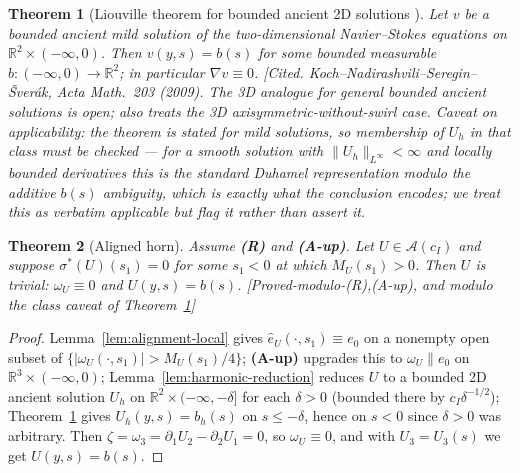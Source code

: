 \documentclass[11pt]{article}
\newtheorem{theorem}{Theorem}[section]
\theoremstyle{definition}
\theoremstyle{remark}
\newcommand{\R}{\mathbb{R}}
\begin{document}
\begin{theorem}[Liouville theorem for bounded ancient 2D solutions
  \cite{KNSS2009}]\label{thm:knss}
  Let $v$ be a bounded ancient mild solution of the two-dimensional
  Navier--Stokes equations on $\R^2\times(-\infty,0)$. Then $v(y,s)=b(s)$ for
  some bounded measurable $b:(-\infty,0)\to\R^2$; in particular
  $\nabla v\equiv0$.
  \emph{[Cited. Koch--Nadirashvili--Seregin--\v{S}ver\'ak, Acta Math.\ 203
  (2009). The 3D analogue for general bounded ancient solutions is open;
  \cite{KNSS2009} also treats the 3D axisymmetric-without-swirl case. Caveat
  on applicability: the theorem is stated for \emph{mild} solutions, so
  membership of $U_h$ in that class must be checked --- for a smooth solution
  with $\|U_h\|_{L^\infty}<\infty$ and locally bounded derivatives this is
  the standard Duhamel representation modulo the additive $b(s)$ ambiguity,
  which is exactly what the conclusion encodes; we treat this as verbatim
  applicable but flag it rather than assert it.}
\end{theorem}

\begin{theorem}[Aligned horn]\label{thm:aligned-horn}
  Assume \textbf{(R)} and \textbf{(A-up)}. Let $U\in\mathcal{A}(c_I)$ and
  suppose $\sigma^*(U)(s_1)=0$ for some $s_1<0$ at which $M_U(s_1)>0$. Then
  $U$ is trivial: $\omega_U\equiv0$ and $U(y,s)=b(s)$.
  \emph{[Proved-modulo-(R),(A-up), and modulo the class caveat of
  Theorem~\ref{thm:knss}]}
\end{theorem}
\begin{proof}
  Lemma~\ref{lem:alignment-local} gives $\hat e_U(\cdot,s_1)\equiv e_0$ on a
  nonempty open subset of $\{|\omega_U(\cdot,s_1)|>M_U(s_1)/4\}$;
  \textbf{(A-up)} upgrades this to $\omega_U\parallel e_0$ on
  $\R^3\times(-\infty,0)$; Lemma~\ref{lem:harmonic-reduction} reduces $U$ to a
  bounded 2D ancient solution $U_h$ on $\R^2\times(-\infty,-\delta]$ for each
  $\delta>0$ (bounded there by $c_I\delta^{-1/2}$);
  Theorem~\ref{thm:knss} gives $U_h(y,s)=b_h(s)$ on $s\leq-\delta$, hence on
  $s<0$ since $\delta>0$ was arbitrary. Then
  $\zeta=\omega_3=\partial_1U_2-\partial_2U_1=0$, so $\omega_U\equiv0$, and
  with $U_3=U_3(s)$ we get $U(y,s)=b(s)$.
\end{proof}
\end{document}
